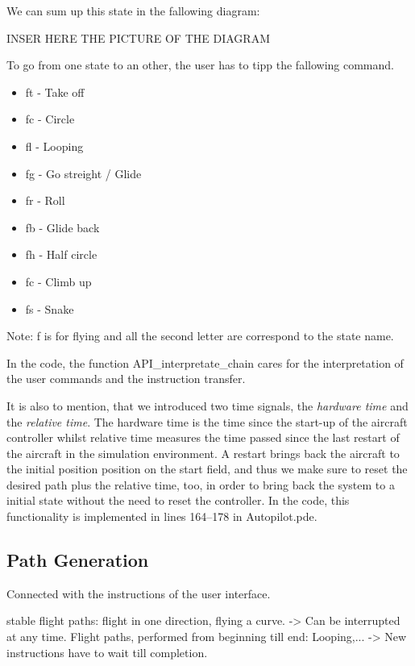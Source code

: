 \documentclass[11pt,a4paper]{scrartcl}		%
\begin{document}
We can sum up this state in the fallowing diagram:

INSER HERE THE PICTURE OF THE DIAGRAM

To go from one state to an other, the user has to tipp the fallowing command.

\begin{itemize}
\item 
ft - Take off 
\item
fc - Circle 
\item
fl - Looping
\item
fg - Go streight / Glide
\item
fr - Roll		
\item	
fb - Glide back
\item
fh - Half circle
\item
fc - Climb up
\item
fs - Snake
\end{itemize}

Note: f is for flying and all the second letter are correspond to the state name.

In the code, the function \textsf{API\_interpretate\_chain} cares for the interpretation of the user commands and the instruction transfer.

\bigskip

It is also to mention, that we introduced two time signals, the \textsl{hardware time} and the \textsl{relative time}.
The hardware time is the time since the start-up of the aircraft controller whilst relative time measures the time passed since the last restart of the aircraft in the simulation environment.
A restart brings back the aircraft to the initial position position on the start field, and thus we make sure to reset the desired path plus the relative time, too, in order to bring back the system to a initial state without the need to reset the controller.
In the code, this functionality is implemented in lines 164--178 in \textsf{Autopilot.pde}.

\medskip




\subsection{Path Generation} \label{ch-Path-Generation}

Connected with the instructions of the user interface.

stable flight paths: flight in one direction, flying a curve. -> Can be interrupted at any time.
Flight paths, performed from beginning till end: Looping,... -> New instructions have to wait till completion.
\end{document}
